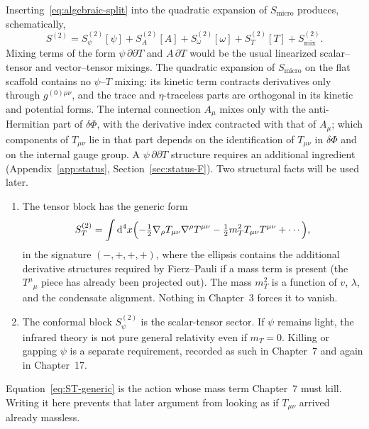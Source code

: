 Inserting~\eqref{eq:algebraic-split} into the quadratic expansion of
\(S_{\mathrm{micro}}\) produces, schematically,
\begin{equation}
  \label{eq:S2-split}
  S^{(2)}
  =S^{(2)}_\psi[\psi]
   +S^{(2)}_A[A]
   +S^{(2)}_\omega[\omega]
   +S^{(2)}_T[T]
   +S^{(2)}_{\mathrm{mix}}.
\end{equation}
Mixing terms of the form \(\psi\,\partial\partial T\) and
\(A\,\partial T\) would be the usual linearized scalar--tensor and
vector--tensor mixings. The quadratic expansion of
\(S_{\mathrm{micro}}\) on the flat scaffold contains no
\(\psi\)--\(T\) mixing: its kinetic term contracts derivatives only
through \(g^{(0)\mu\nu}\), and the trace and \(\eta\)-traceless parts
are orthogonal in its kinetic and potential forms. The internal
connection \(A_\mu\) mixes only with the anti-Hermitian part of
\(\delta\Phi\), with the derivative index contracted with that of
\(A_\mu\); which components of \(T_{\mu\nu}\) lie in that part depends
on the identification of \(T_{\mu\nu}\) in \(\delta\Phi\) and on the
internal gauge group. A \(\psi\,\partial\partial T\) structure requires
an additional ingredient (Appendix~\ref{app:status},
Section~\ref{sec:status-F}). Two structural facts will be used later.

\begin{enumerate}
  \item The tensor block has the generic form
  \begin{equation}
    \label{eq:ST-generic}
    S^{(2)}_T
    =\int\mathrm{d}^4x
     \Bigl(
       -\tfrac12\nabla_\rho T_{\mu\nu}\nabla^\rho T^{\mu\nu}
       -\tfrac12 m_T^2 T_{\mu\nu}T^{\mu\nu}
       +\cdots
     \Bigr),
  \end{equation}
  in the signature \((-,+,+,+)\), where the ellipsis contains the
  additional derivative structures required by Fierz--Pauli if a mass
  term is present (the \(T^\mu{}_\mu\) piece has already been projected
  out). The mass \(m_T^2\) is a function of \(v\), \(\lambda\), and the
  condensate alignment. Nothing in Chapter~3 forces it to vanish.
  \item The conformal block \(S^{(2)}_\psi\) is the scalar-tensor
        sector. If \(\psi\) remains light, the infrared theory is not
        pure general relativity even if \(m_T=0\). Killing or gapping
        \(\psi\) is a separate requirement, recorded as such in
        Chapter~7 and again in Chapter~17.
\end{enumerate}

Equation~\eqref{eq:ST-generic} is the action whose mass term
Chapter~7 must kill. Writing it here prevents that later argument
from looking as if \(T_{\mu\nu}\) arrived already massless.


